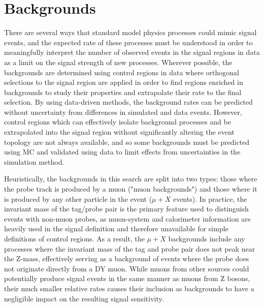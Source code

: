 \chapter{Backgrounds}
\label{backgrounds}
There are several ways that standard model physics processes could mimic signal events, and the expected rate of these processes must be understood in order to meaningfully interpret the number of observed events in the signal regions in data as a limit on the signal strength of new processes.
Wherever possible, the backgrounds are determined using control regions in data where orthogonal selections to the signal region are applied in order to find regions enriched in backgrounds to study their properties and extrapolate their rate to the final selection.
By using data-driven methods, the background rates can be predicted without uncertainty from differences in simulated and data events. 
However, control regions which can effectively isolate background processes and be extrapolated into the signal region without significantly altering the event topology are not always available, and so some backgrounds must be predicted using MC and validated using data to limit effects from uncertainties in the simulation method.

Heuristically, the backgrounds in this search are split into two types: those where the probe track is produced by a muon ("muon backgrounds") and those where it is produced by any other particle in the event ($\mu+X$ events).
In practice, the invariant mass of the tag/probe pair is the primary feature used to distinguish events with non-muon probes, as muon-system and calorimeter information are heavily used in the signal definition and therefore unavailable for simple definitions of control regions.
As a result, the $\mu+X$ backgrounds include any processes where the invariant mass of the tag and probe pair does not peak near the Z-mass, effectively serving as a background of events where the probe does not originate directly from a DY muon.
While muons from other sources could potentially produce signal events in the same manner as muons from Z bosons, their much smaller relative rates causes their inclusion as backgrounds to have a negligible impact on the resulting signal sensitivity.

